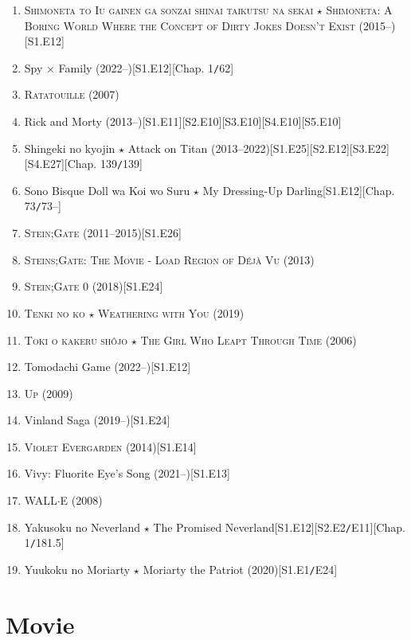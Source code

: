 \documentclass[oneside]{book}
\numberwithin{equation}{section}
\begin{document}
\begin{enumerate}
    Rascal Does Not Dream of Bunny Girl Senpai (2018--)\hfill[S1.E14]
    \item \textsc{Shimoneta to Iu gainen ga sonzai shinai taikutsu na sekai $\star$ Shimoneta: A Boring World Where the Concept of Dirty Jokes Doesn't Exist} (2015--)\hfill[S1.E12]
    \item Spy $\times$ Family (2022--)\hfill[S1.E12][Chap. 1\texttt{/}62]
    \item \textsc{Ratatouille} (2007)
    \item Rick and Morty (2013--)\hfill[S1.E11][S2.E10][S3.E10][S4.E10][S5.E10]
    \item Shingeki no kyojin $\star$ Attack on Titan (2013--2022)\hfill[S1.E25][S2.E12][S3.E22][S4.E27][Chap. 139\texttt{/}139]
    \item Sono Bisque Doll wa Koi wo Suru $\star$ My Dressing-Up Darling\hfill[S1.E12][Chap. 73\texttt{/}73--]
    \item \textsc{Stein;Gate} (2011--2015)\hfill[S1.E26]
    \item \textsc{Steins;Gate: The Movie - Load Region of Déjà Vu} (2013)
    \item \textsc{Stein;Gate 0} (2018)\hfill[S1.E24]
    \item \textsc{Tenki no ko $\star$ Weathering with You} (2019)
    \item \textsc{Toki o kakeru sh\^ojo $\star$ The Girl Who Leapt Through Time} (2006)
    \item Tomodachi Game (2022--)\hfill[S1.E12]
    \item \textsc{Up} (2009)
    \item Vinland Saga (2019--)\hfill[S1.E24]
    \item \textsc{Violet Evergarden} (2014)\hfill[S1.E14]
    \item Vivy: Fluorite Eye's Song (2021--)\hfill[S1.E13]
    \item \textsc{WALL$\cdot$E} (2008)
    \item Yakusoku no Neverland $\star$ The Promised Neverland\hfill[S1.E12][S2.E2\texttt{/}E11][Chap. 1\texttt{/}181.5]
    \item Yuukoku no Moriarty $\star$ Moriarty the Patriot (2020)\hfill[S1.E1\texttt{/}E24]
\end{enumerate}


\chapter{Movie}
\end{document}
